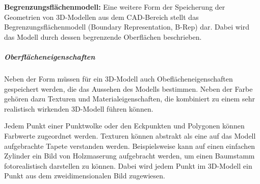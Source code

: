 {\bfseries Begrenzungsflächenmodell:} Eine weitere Form der Speicherung der Geometrien von 3D-Modellen aus dem CAD-Bereich stellt das Begrenzungsflächenmodell (Boundary Representation, B-Rep) dar. Dabei wird das Modell durch dessen begrenzende Oberflächen beschrieben.


\subparagraph{Oberflächeneigenschaften}\label{3d_aussehen}
Neben der Form müssen für ein 3D-Modell auch Obeflächeneigenschaften gespeichert werden, die das Aussehen des Modells bestimmen. Neben der Farbe gehören dazu Texturen und Materialeigenschaften, die kombiniert zu einem sehr realistisch wirkenden 3D-Modell führen können. 

Jedem Punkt einer Punktwolke oder den Eckpunkten und Polygonen können Farbwerte zugeordnet werden. Texturen können abstrakt als eine auf das Modell aufgebrachte Tapete verstanden werden. Beispielsweise kann auf einen einfachen Zylinder ein Bild von Holzmaserung aufgebracht werden, um einen Baumstamm fotorealistisch darstellen zu können. Dabei wird jedem Punkt im 3D-Modell ein Punkt aus dem zweidimensionalen Bild zugewiesen. 

